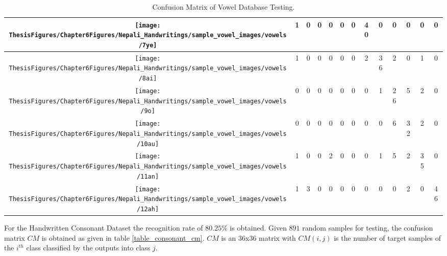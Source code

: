 \begin{table}[h]
\begin{tabular}{|c|c|c|c|c|c|c|c|c|c|c|c|c|}
\hline 
\texttt{[image: ThesisFigures/Chapter6Figures/Nepali\_Handwritings/sample\_vowel\_images/vowels/7ye]} & 1 & 0 & 0 & 0 & 0 & 0 & 40 & 0 & 0 & 0 & 0 & 0\tabularnewline
\hline 
\texttt{[image: ThesisFigures/Chapter6Figures/Nepali\_Handwritings/sample\_vowel\_images/vowels/8ai]} & 1 & 0 & 0 & 0 & 0 & 0 & 2 & 36 & 2 & 0 & 1 & 0\tabularnewline
\hline 
\texttt{[image: ThesisFigures/Chapter6Figures/Nepali\_Handwritings/sample\_vowel\_images/vowels/9o]} & 0 & 0 & 0 & 0 & 0 & 0 & 0 & 1 & 26 & 5 & 2 & 0\tabularnewline
\hline 
\texttt{[image: ThesisFigures/Chapter6Figures/Nepali\_Handwritings/sample\_vowel\_images/vowels/10au]} & 0 & 0 & 0 & 0 & 0 & 0 & 0 & 0 & 6 & 32 & 2 & 0\tabularnewline
\hline 
\texttt{[image: ThesisFigures/Chapter6Figures/Nepali\_Handwritings/sample\_vowel\_images/vowels/11an]} & 1 & 0 & 0 & 2 & 0 & 0 & 0 & 1 & 5 & 2 & 35 & 0\tabularnewline
\hline 
\texttt{[image: ThesisFigures/Chapter6Figures/Nepali\_Handwritings/sample\_vowel\_images/vowels/12ah]} & 1 & 3 & 0 & 0 & 0 & 0 & 0 & 0 & 0 & 2 & 0 & 46 \tabularnewline
\hline 
\end{tabular}
\caption{Confusion Matrix of Vowel Database Testing.}
\end{table}


For the Handwritten Consonant Dataset the recognition rate of $80.25\%$ is obtained. Given $891$ random samples for testing, the confusion matrix $CM$ is obtained as given in table \ref{table_consonant_cm}. $CM$ is an $36$x$36$ matrix with $CM(i,j)$ is the number of target samples of the $i^{th}$ class classified by the outputs into class $j$.



